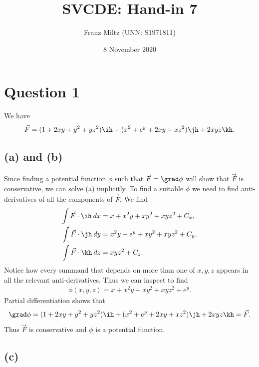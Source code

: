 \documentclass{article}
\begin{document}
\title{SVCDE: Hand-in 7}
\author{Franz Miltz (UNN: S1971811)}
\date{8 November 2020}
\maketitle


\section*{Question 1}


We have 
\begin{align*}
  \vec F = (1+2xy+y^2+yz^2)\ih + (x^2+e^y+2xy+xz^2)\jh + 2xyz\kh.
\end{align*}

\subsection*{(a) and (b)}

Since finding a potential function $\phi$ such that $\vec F = \grad\phi$ 
will show that $\vec F$ is conservative, we can solve (a) implicitly.
To find a suitable $\phi$ we need to find anti-derivatives of all the components
of $\vec F$. We find
\begin{align*}
  \int \vec F\cdot \ih\: dx &= x + x^2y + xy^2 + xyz^2 + C_x,\\
  \int \vec F\cdot \jh\: dy &= x^2y+e^y+xy^2+xyz^2+C_y,\\
  \int \vec F\cdot \kh\: dz &= xyz^2 + C_z.
\end{align*}
Notice how every summand that depends on more than one of $x,y,z$ appears 
in all the relevant anti-derivatives. Thus we can inspect to find
\begin{align}
  \label{eqphi}
  \phi(x,y,z) = x + x^2y + xy^2 + xyz^2 + e^y.
\end{align}
Partial differentiation shows that
\begin{align*}
  \grad \phi = (1+2xy+y^2+yz^2)\ih + (x^2+e^y+2xy+xz^2)\jh + 2xyz\kh = \vec F.
\end{align*}
Thus $\vec F$ is conservative and $\phi$ is a potential function.

\subsection*{(c)}
\end{document}
